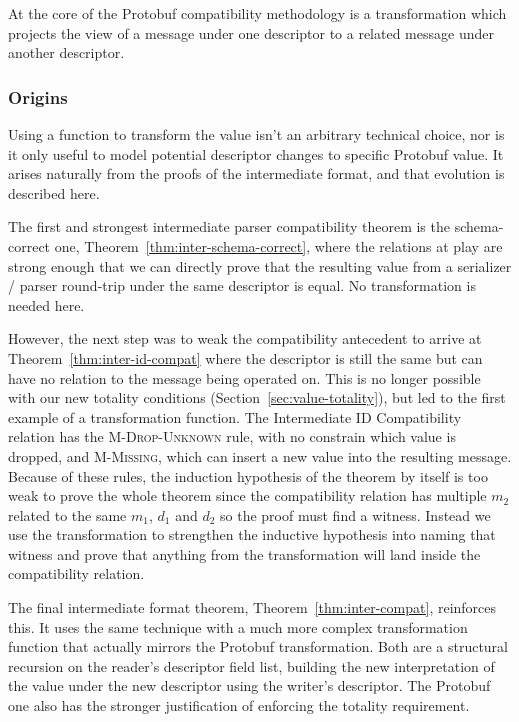 At the core of the Protobuf compatibility methodology is a transformation which
projects the view of a message under one descriptor to a related message under
another descriptor.

\subsubsection{Origins}

Using a function to transform the value isn't an arbitrary technical choice, nor
is it only useful to model potential descriptor changes to specific Protobuf
value. It arises naturally from the proofs of the intermediate format, and that
evolution is described here.

The first and strongest intermediate parser compatibility theorem is the
schema-correct one, Theorem~\ref{thm:inter-schema-correct}, where the relations
at play are strong enough that we can directly prove that the resulting value
from a serializer / parser round-trip under the same descriptor is equal. No
transformation is needed here.

However, the next step was to weak the compatibility antecedent to arrive at
Theorem~\ref{thm:inter-id-compat} where the descriptor is still the same but can
have no relation to the message being operated on. This is no longer possible
with our new totality conditions (Section~\ref{sec:value-totality}), but led to
the first example of a transformation function. The Intermediate ID
Compatibility relation has the \textsc{M-Drop-Unknown} rule, with no constrain
which value is dropped, and \textsc{M-Missing}, which can insert a new value
into the resulting message. Because of these rules, the induction hypothesis of
the theorem by itself is too weak to prove the whole theorem since the
compatibility relation has multiple $m_2$ related to the same $m_1$, $d_1$ and
$d_2$ so the proof must find a witness. Instead we use the transformation to
strengthen the inductive hypothesis into naming that witness and prove that
anything from the transformation will land inside the compatibility relation.

The final intermediate format theorem, Theorem~\ref{thm:inter-compat},
reinforces this. It uses the same technique with a much more complex
transformation function that actually mirrors the Protobuf transformation. Both
are a structural recursion on the reader's descriptor field list, building the
new interpretation of the value under the new descriptor using the writer's
descriptor. The Protobuf one also has the stronger justification of enforcing
the totality requirement.

